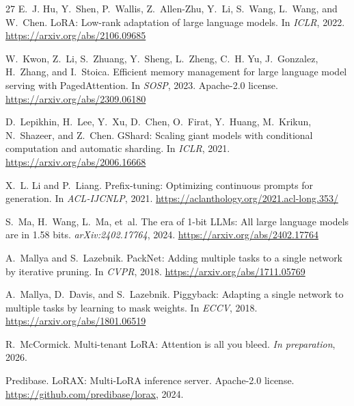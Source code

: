 \documentclass[11pt,a4paper]{article}
\begin{document}
\begin{thebibliography}{27}
E.~J. Hu, Y.~Shen, P.~Wallis, Z.~Allen-Zhu, Y.~Li, S.~Wang, L.~Wang, and
  W.~Chen.
\newblock LoRA: Low-rank adaptation of large language models.
\newblock In \emph{ICLR}, 2022.
\newblock \url{https://arxiv.org/abs/2106.09685}

W.~Kwon, Z.~Li, S.~Zhuang, Y.~Sheng, L.~Zheng, C.~H. Yu, J.~Gonzalez,
  H.~Zhang, and I.~Stoica.
\newblock Efficient memory management for large language model serving with PagedAttention.
\newblock In \emph{SOSP}, 2023.
\newblock Apache-2.0 license.
\newblock \url{https://arxiv.org/abs/2309.06180}

D.~Lepikhin, H.~Lee, Y.~Xu, D.~Chen, O.~Firat, Y.~Huang, M.~Krikun,
  N.~Shazeer, and Z.~Chen.
\newblock GShard: Scaling giant models with conditional computation and
  automatic sharding.
\newblock In \emph{ICLR}, 2021.
\newblock \url{https://arxiv.org/abs/2006.16668}

X.~L. Li and P.~Liang.
\newblock Prefix-tuning: Optimizing continuous prompts for generation.
\newblock In \emph{ACL-IJCNLP}, 2021.
\newblock \url{https://aclanthology.org/2021.acl-long.353/}

S.~Ma, H.~Wang, L.~Ma, et~al.
\newblock The era of 1-bit LLMs: All large language models are in 1.58 bits.
\newblock \emph{arXiv:2402.17764}, 2024.
\newblock \url{https://arxiv.org/abs/2402.17764}

A.~Mallya and S.~Lazebnik.
\newblock PackNet: Adding multiple tasks to a single network by iterative pruning.
\newblock In \emph{CVPR}, 2018.
\newblock \url{https://arxiv.org/abs/1711.05769}

A.~Mallya, D.~Davis, and S.~Lazebnik.
\newblock Piggyback: Adapting a single network to multiple tasks by learning to mask weights.
\newblock In \emph{ECCV}, 2018.
\newblock \url{https://arxiv.org/abs/1801.06519}

R.~McCormick.
\newblock Multi-tenant LoRA: Attention is all you bleed.
\newblock \emph{In preparation}, 2026.

Predibase.
\newblock LoRAX: Multi-LoRA inference server.
\newblock Apache-2.0 license.
\newblock \url{https://github.com/predibase/lorax}, 2024.


\end{thebibliography}
\end{document}

